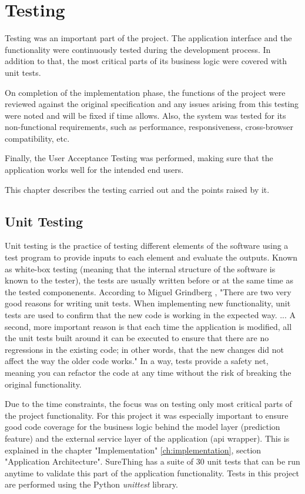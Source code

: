 \chapter{Testing}
\label{ch:testing}
Testing was an important part of the project. The application interface and the functionality were continuously tested during the development process. In addition to that, the most critical parts of its business logic were covered with unit tests.

On completion of the implementation phase, the functions of the project were reviewed against the original specification and any issues arising from this testing were noted and will be fixed if time allows. Also, the system was tested for its non-functional requirements, such as performance, responsiveness, cross-browser compatibility, etc.

Finally, the User Acceptance Testing was performed, making sure that the application works well for the intended end users. 

This chapter describes the testing carried out and the points raised by it.

\section{Unit Testing}
\label{sec:unittesting_test}
Unit testing is the practice of testing different elements of the software using a test program to provide inputs to each element and evaluate the outputs.
Known as white-box testing (meaning that the internal structure of the software is known to the tester), the tests are usually written before or at the same time as the tested componenents. According to Miguel Grindberg \citep{book:Grindberg2014FlaskWebDevelopment}, "There are two very good reasons for writing unit tests. When implementing new functionality, unit tests are used to confirm that the new code is working in the expected way. ... A second, more important reason is that each time the application is modified, all the unit tests built around it can be executed to ensure that there are no regressions  in the existing code; in other words, that the new changes did not affect the way the older code works." In a way, tests provide a safety net, meaning you can refactor the code at any time without the risk of breaking the original functionality.

Due to the time constraints, the focus was on testing only most critical parts of the project functionality. For this project it was especially important to ensure good code coverage for the business logic behind the model layer (prediction feature) and the external service layer of the application (api wrapper). This is explained in the chapter "Implementation" \ref{ch:implementation}, section "Application Architecture". SureThing has a suite of 30 unit tests that can be run anytime to validate this part of the application functionality. Tests in this project are performed using the Python \emph{unittest} library.

